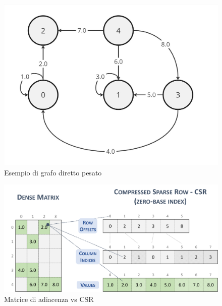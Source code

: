        \begin{figure}[h]
            \centering
            \includegraphics[width=0.5\linewidth]{images/graph.jpg}
            \caption{Esempio di grafo diretto pesato}
            \label{fig:graph-example}
        \end{figure}

        \begin{figure}[h]
            \centering
            \includegraphics[width=0.9\linewidth]{images/csr-example.png}
            \caption{Matrice di adiacenza vs CSR}
            \label{fig:csr-example}
        \end{figure}
